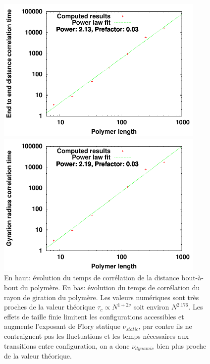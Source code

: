 \documentclass[a4paper,11pt]{article}
\begin{document}
\begin{figure}[H]
\begin{center}
\includegraphics[width=0.9\textwidth]{tpscorrelendtoend.pdf}

\includegraphics[width=0.9\textwidth]{tpscorrelgyr.pdf}

\caption{En haut: évolution du temps de corrélation de la distance bout-à-bout du polymère. En bas: évolution du temps de corrélation du rayon de giration du polymère. Les valeurs numériques sont très proches de la valeur théorique $\tau_c \propto N^{1+2\nu}$ soit environ $N^{2.176}$. Les effets de taille finie limitent les configurations accessibles et augmente l'exposant de Flory statique $\nu_{static}$, par contre ils ne contraignent pas les fluctuations et les temps nécessaires aux transitions entre configuration, on a donc $\nu_{dynamic}$ bien plus proche de la valeur théorique.}
\label{dyntpscorrel}
\end{center}
\end{figure}
\end{document}
